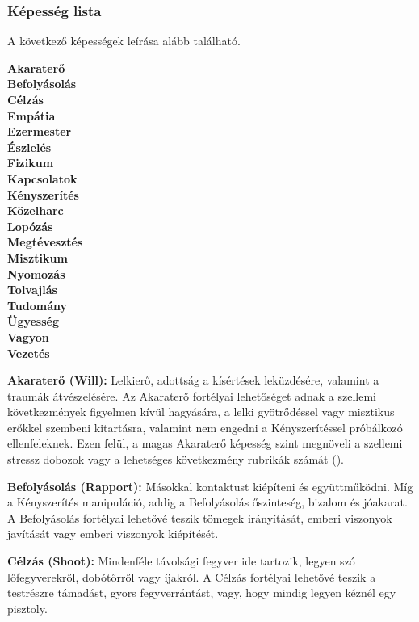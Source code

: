 \subsubsection{Képesség lista}

A következő képességek leírása alább található.

\begin{multicols}{5}
\setlength{\parindent}{0em}
\textbf{%
Akaraterő \\
Befolyásolás \\
Célzás \\
Empátia \\
Ezermester \\
Észlelés \\
Fizikum \\
Kapcsolatok \\
Kényszerítés \\
Közelharc \\
Lopózás \\
Megtévesztés \\
Misztikum \\
Nyomozás \\
Tolvajlás \\
Tudomány \\
Ügyesség \\
Vagyon \\
Vezetés
}
\end{multicols}

\textbf{Akaraterő (Will):} Lelkierő, adottság a kísértések leküzdésére, valamint a traumák átvészelésére. Az Akaraterő fortélyai lehetőséget adnak a szellemi következmények figyelmen kívül hagyására, a lelki gyötrődéssel vagy misztikus erőkkel szembeni kitartásra, valamint nem engedni a Kényszerítéssel próbálkozó ellenfeleknek. Ezen felül, a magas Akaraterő képesség szint megnöveli a szellemi stressz dobozok vagy a lehetséges következmény rubrikák számát ().

\textbf{Befolyásolás (Rapport):} Másokkal kontaktust kiépíteni és együttműködni. Míg a Kényszerítés manipuláció, addig a Befolyásolás őszinteség, bizalom és jóakarat. A Befolyásolás fortélyai lehetővé teszik tömegek irányítását, emberi viszonyok javítását vagy emberi viszonyok kiépítését.

\textbf{Célzás (Shoot):} Mindenféle távolsági fegyver ide tartozik, legyen szó lőfegyverekről, dobótőrről vagy íjakról. A Célzás fortélyai lehetővé teszik a testrészre támadást, gyors fegyverrántást, vagy, hogy mindig legyen kéznél egy pisztoly.

